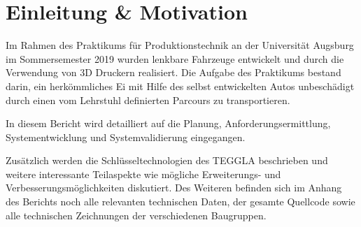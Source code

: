 \chapter{Einleitung \& Motivation}
Im Rahmen des Praktikums für Produktionstechnik an der Universität Augsburg im Sommersemester 2019 wurden lenkbare Fahrzeuge entwickelt und durch die Verwendung von 3D Druckern realisiert. Die Aufgabe des Praktikums bestand darin, ein herkömmliches Ei mit Hilfe des selbst entwickelten Autos unbeschädigt durch einen vom Lehrstuhl definierten Parcours zu transportieren.

In diesem Bericht wird detailliert auf die Planung, Anforderungsermittlung, Systementwicklung und Systemvalidierung eingegangen. 

Zusätzlich werden die Schlüsseltechnologien des TEGGLA beschrieben und weitere interessante Teilaspekte wie mögliche Erweiterungs- und Verbesserungsmöglichkeiten diskutiert. Des Weiteren befinden sich im Anhang des Berichts noch alle relevanten technischen Daten, der gesamte Quellcode sowie alle technischen Zeichnungen der verschiedenen Baugruppen.

